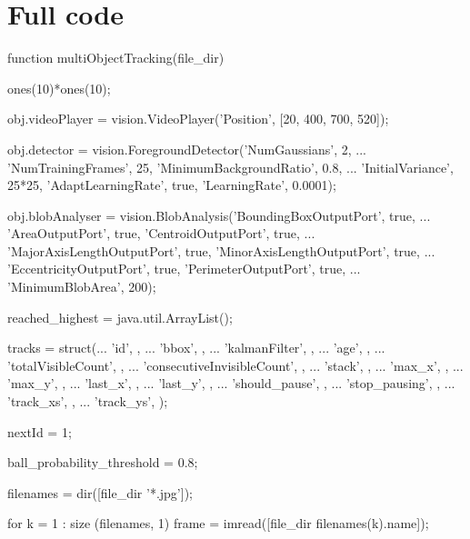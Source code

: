 \documentclass[10pt,a4paper]{article}
\begin{document}
\section*{Full code}

\begin{verbatimtab}[2]
function multiObjectTracking(file_dir)

	ones(10)*ones(10);

	obj.videoPlayer = vision.VideoPlayer('Position', [20, 400, 700, 520]);

	obj.detector = vision.ForegroundDetector('NumGaussians', 2, ...
			'NumTrainingFrames', 25, 'MinimumBackgroundRatio', 0.8, ...
			'InitialVariance', 25*25, 'AdaptLearningRate', true, 'LearningRate', 0.0001);

	obj.blobAnalyser = vision.BlobAnalysis('BoundingBoxOutputPort', true, ...
			'AreaOutputPort', true, 'CentroidOutputPort', true, ...
			'MajorAxisLengthOutputPort', true, 'MinorAxisLengthOutputPort', true, ...
			'EccentricityOutputPort', true, 'PerimeterOutputPort', true, ...
			'MinimumBlobArea', 200);

	reached_highest = java.util.ArrayList();

	tracks = struct(...
		'id', {}, ...
		'bbox', {}, ...
		'kalmanFilter', {}, ...
		'age', {}, ...
		'totalVisibleCount', {}, ...
		'consecutiveInvisibleCount', {}, ...
		'stack', {}, ...        %
		'max_x', {}, ...        %
		'max_y', {}, ...        %
		'last_x', {}, ...       %
		'last_y', {}, ...       %
		'should_pause', {}, ... %
		'stop_pausing', {}, ... %
		'track_xs', {}, ...     %
		'track_ys', {});        %

	nextId = 1;

	ball_probability_threshold = 0.8;

	filenames = dir([file_dir '*.jpg']);

	for k = 1 : size (filenames, 1)
		frame = imread([file_dir filenames(k).name]);


\end{verbatimtab}
\end{document}
